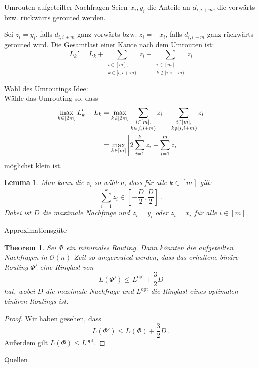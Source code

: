\documentclass[8pt]{beamer}
\newcommand{\cO}{\mathcal{O}}
\newcommand{\Lopt}{L^{\mathrm{opt}}}
\theoremstyle{claim}
\newtheorem{mytheorem}[theorem]{Theorem}
\newtheorem{mylemma}[theorem]{Lemma}
\begin{document}
	\begin{frame}{Umrouten aufgeteilter Nachfragen}
		Seien $x_i, y_i$ die Anteile an $d_{i, i+m}$, die vorwärts bzw. rückwärts gerouted werden.
		\vspace{5mm}
		\begin{center}
			
		\end{center}
		\vspace{5mm}
		Sei $z_i = y_i$, falls $d_{i, i+m}$ ganz vorwärts bzw. $z_i = -x_i$, falls $d_{i, i+m}$ ganz rückwärts gerouted wird.\pause
		Die Gesamtlast einer Kante nach dem Umrouten ist:
		\begin{equation}
			L_k' = L_k + \sum_{\substack{i \in [m],\\ k \in [i, i+m)}} z_i - \sum_{\substack{i \in [m],\\ k \notin[i, i+m)}} z_i
		\end{equation}
	
	\end{frame}

	\begin{frame}{Wahl des Umroutings}
		Idee:\\
		Wähle das Umrouting so, dass 
		\begin{align}
			\max_{k \in [2m]} L_k' - L_k &= \max_{k \in [2m]} \sum_{\substack{i \in [m],\\ k \in [i, i+m)}} z_i - \sum_{\substack{i \in [m],\\ k \notin[i, i+m)}} z_i\\
			&= \max_{k \in [m]} \abs{2\sum_{i = 1}^k z_i - \sum_{i = 1}^m z_i }
		\end{align}
		möglichst klein ist.\pause
		\begin{mylemma}
			Man kann die $z_i$ so wählen, dass für alle $k \in [m]$ gilt:
			\begin{equation}
				\sum_{i = 1}^k z_i \in \left[-\frac{D}{2}, \frac{D}{2}\right] \ .
			\end{equation}
			Dabei ist $D$ die maximale Nachfrage und $z_i = y_i$ oder $z_i = x_i$ für alle $i \in [m]$.
		\end{mylemma}
	\end{frame}
	
	\begin{frame}{Approximationsgüte}
		\begin{mytheorem}
			Sei $\Phi$ ein minimales Routing.
			Dann könnten die aufgeteilten Nachfragen in $\cO(n)$ Zeit so umgerouted werden, dass das erhaltene binäre Routing $\Phi'$ eine Ringlast von
			\begin{equation}
				L(\Phi') \leq \Lopt + \frac{3}{2} D
			\end{equation}
			hat, wobei $D$ die maximale Nachfrage und $\Lopt$ die Ringlast eines optimalen binären Routings ist.
		\end{mytheorem}
		\begin{proof}
			Wir haben gesehen, dass
			\begin{equation}
				L(\Phi') \leq L(\Phi) + \frac{3}{2} D \ .
			\end{equation}
			Außerdem gilt $L(\Phi) \leq \Lopt$.
		\end{proof}
	\end{frame}
	
	\begin{frame}{Quellen}
		\nocite{schrijver99, karp72}
		
	\end{frame}
\end{document}
